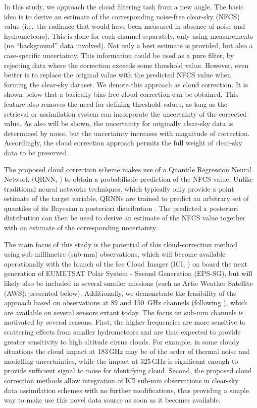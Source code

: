 \documentclass[amt, manuscript]{copernicus}
\begin{document}
In this study, we approach the cloud filtering task from a new angle. The basic idea
is to derive an estimate of the corresponding noise-free clear-sky (NFCS) value
(i.e.\ the radiance that would have been measured in absence of noise and
hydrometeors). This is done for each channel separately, only using
measurements (no ``background'' data involved). Not only a best estimate is
provided, but also a case-specific uncertainty. This information could be used as a pure filter, by rejecting data where the correction exceeds some threshold value. However, even
better is to replace the original value with the predicted NFCS value when
forming the clear-sky dataset. We denote this approach as cloud correction. It
is shown below that a basically bias free cloud correction can be obtained.
This feature also removes the need for defining threshold values, as long as the retrieval or
assimilation system can incorporate the uncertainty of the corrected value. As
also will be shown, the uncertainty for originally clear-sky data is determined
by noise, but the uncertainty increases with magnitude of correction.
Accordingly, the cloud correction approach permits the full weight of
clear-sky data to be preserved.

The proposed cloud correction scheme makes use of a Quantile Regression Neural
Network (QRNN, \citet{pfreundschuh:aneur:18}) to obtain a probabilistic prediction of the NFCS value. Unlike traditional neural networks techniques, which typically only provide a point
estimate of the target variable, QRNNs are trained to predict an arbitrary set
of quantiles of its Bayesian a posteriori distribution
\citep{pfreundschuh:aneur:18}. The predicted a posteriori distribution 
can then be used to derive an estimate of the NFCS value together with an estimate
of the corresponding uncertainty.

The main focus of this study is the potential of this cloud-correction
method using sub-millimetre (sub-mm) observations, which will become available
operationally with the launch of the Ice Cloud Imager (ICI,
\citet{eriksson:towar:20}) on board the next generation of EUMETSAT Polar System - Second Generation (EPS-SG), but will likely also be included in
several smaller missions (such as Artic Weather Satellite (AWS); presented
below). Additionally, we demonstrate the feasibility of the approach based on
observations at 89 and 150\ GHz channels (following
\citet{geer2015scatteringindex}), which are available on several sensors extant today. The focus
on sub-mm channels is motivated by several reasons. First, the higher
frequencies are more sensitive to scattering effects from smaller
hydrometeors and are thus expected to provide greater sensitivity to high altitude cirrus clouds. For example, in some cloudy situations the
cloud impact at 183\,GHz may be of the order of thermal noise and modelling uncertainties,
while the impact at 325\,GHz is significant enough to provide sufficient signal to noise for identifying cloud. Second, the proposed
cloud correction methods allow integration of ICI sub-mm observations in
clear-sky data assimilation schemes with no further modifications, thus providing a simple
way to make use this novel data source as soon as it becomes available.
\end{document}
